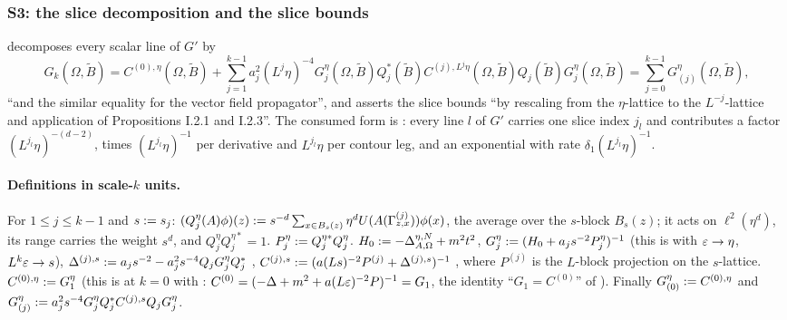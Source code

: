 
\subsubsection{S3: the slice decomposition \cite[(2.6)]{Ba3} and the slice bounds \cite[(2.10)--(2.12)]{Ba3}}\label{sup1:ssec:S3}

\cite[p.~424]{Ba3} decomposes every scalar line of $G'$ by
\begin{equation}\label{sup1:eq:26}
G_k(\Omega,\tilde B)=C^{(0),\eta}(\Omega,\tilde B)+\sum_{j=1}^{k-1}a_j^2(L^j\eta)^{-4}G^\eta_j(\Omega,\tilde B)Q^*_j(\tilde B)C^{(j),L^j\eta}(\Omega,\tilde B)Q_j(\tilde B)G^\eta_j(\Omega,\tilde B)=\sum_{j=0}^{k-1}G^\eta_{(j)}(\Omega,\tilde B),
\end{equation}
``and the similar equality for the vector field propagator'', and \cite[p.~426]{Ba3} asserts the slice bounds \cite[(2.10)--(2.12)]{Ba3} ``by rescaling from the $\eta$-lattice to the $L^{-j}$-lattice and application of Propositions I.2.1 and I.2.3''. The consumed form is \cite[(2.13)--(2.14)]{Ba3}: every line $l$ of $G'$ carries one slice index $j_l$ and contributes a factor $(L^{j_l}\eta)^{-(d-2)}$, times $(L^{j_l}\eta)^{-1}$ per derivative and $L^{j_l}\eta$ per contour leg, and an exponential with rate $\delta_1(L^{j_l}\eta)^{-1}$.

\paragraph{Definitions in scale-$k$ units.} For $1\le j\le k-1$ and $s:= s_j$: $(Q^\eta_j(A)\phi)(z):= s^{-d}\sum_{x\in B_s(z)}\eta^dU(A(\Gamma^{(j)}_{z,x}))\phi(x)$, the average over the $s$-block $B_s(z)$; it acts on $\ell^2(\eta^d)$, its range carries the weight $s^d$, and $Q^\eta_jQ^{\eta*}_j=1$. $P^\eta_j:= Q^{\eta*}_jQ^\eta_j$. $H_0:=-\Delta^{\eta,N}_{A,\Omega}+m^2t^2$, $G^\eta_j:=(H_0+a_js^{-2}P^\eta_j)^{-1}$ (this is \cite[(2.20)]{Ba1} with $\varepsilon\to\eta$, $L^k\varepsilon\to s$), $\Delta^{(j),s}:= a_js^{-2}-a_j^2s^{-4}Q_jG^\eta_jQ_j^*$ \cite[(2.21)]{Ba1}, $C^{(j),s}:=(a(Ls)^{-2}P^{(j)}+\Delta^{(j),s})^{-1}$ \cite[(2.30)]{Ba1}, where $P^{(j)}$ is the $L$-block projection on the $s$-lattice. $C^{(0),\eta}:= G^\eta_1$ (this is \cite[(2.30)]{Ba1} at $k=0$ with \cite[(2.17)]{Ba1}: $C^{(0)}=(-\Delta+m^2+a(L\varepsilon)^{-2}P)^{-1}=G_1$, the identity ``$G_1=C^{(0)}$'' of \cite[p.~612]{Ba1}). Finally $G^\eta_{(0)}:= C^{(0),\eta}$ and $G^\eta_{(j)}:= a_j^2s^{-4}G^\eta_jQ_j^*C^{(j),s}Q_jG^\eta_j$.

